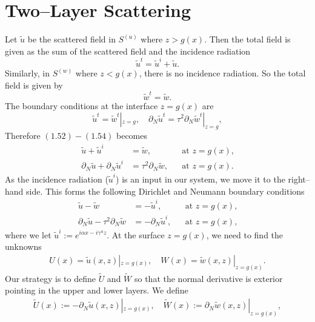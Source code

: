 \section{Two--Layer Scattering}
\label{intro:two_layer_scattering}
Let $\tilde{u}$ be the scattered field in $S^{(u)}$ where $z>g(x)$. Then the total field is given as the sum of the scattered field and the incidence radiation
\begin{equation}
    \tilde{u}^t=\tilde{u}^i + \tilde{u}.
\end{equation}
Similarly, in $S^{(w)}$ where $z<g(x)$, there is no incidence radiation. So the total field is given by \begin{equation}
    \tilde{w}^t=\tilde{w}.
\end{equation}
The boundary conditions at the interface $z=g(x)$ are
\begin{equation}
    \tilde{u}^t = \tilde{w}^t|_{z=g}, \quad \partial_N \tilde{u}^t = \tau^2 \partial_N \tilde{w}^t|_{z=g},
\end{equation}
Therefore $(1.52)-(1.54)$ becomes
\begin{subequations}
\begin{align}
\tilde{u} + \tilde{u}^i &= \tilde{w}, &&\text{at $z=g(x)$,} \\
\partial_N \tilde{u} + \partial_N \tilde{u}^i &= \tau^2 \partial_N \tilde{w}, &&\text{at $z=g(x)$.}
\end{align}
\end{subequations}
As the incidence radiation ($\tilde{u}^i$) is an input in our system, we move it to the right--hand side. This forms the following Dirichlet and Neumann boundary conditions 
\begin{subequations}
\begin{align}
\tilde{u}-\tilde{w}&=-\tilde{u}^{i},&&\text{at $z=g(x)$,}\\
\partial_N \tilde{u}-\tau^2\partial_N \tilde{w}&=-\partial_N \tilde{u}^{i},&&\text{at $z=g(x)$,}
\end{align}
\end{subequations}
where we let $\tilde{u}^{i}:=e^{i\alpha x-i\gamma^u z}$. At the surface $z=g(x)$, we need to find the unknowns
\begin{align}
U(x)=\tilde{u}(x,z)|_{z=g(x)},\quad W(x)=\tilde{w}(x,z)|_{z=g(x)}.    
\end{align}
Our strategy is to define $\tilde{U}$ and $\tilde{W}$ so that the normal derivative is exterior pointing in the upper and lower layers. We define
\begin{align}
\tilde{U}(x):=-\partial_N \tilde{u}(x,z)|_{z=g(x)},\quad \tilde{W}(x):=\partial_N \tilde{w}(x,z)|_{z=g(x)},
\end{align}
